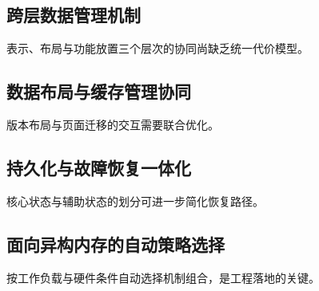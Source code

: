 \subsection{跨层数据管理机制}
表示、布局与功能放置三个层次的协同尚缺乏统一代价模型\cite{binnigEnd2016,zamanianEnd2017}。
\subsection{数据布局与缓存管理协同}
版本布局与页面迁移的交互需要联合优化\cite{xiangNomad2024,weinerTmo2022}。
\subsection{持久化与故障恢复一体化}
核心状态与辅助状态的划分可进一步简化恢复路径\cite{correiaRomulus2018,assaTl4x2023}。
\subsection{面向异构内存的自动策略选择}
按工作负载与硬件条件自动选择机制组合，是工程落地的关键\cite{leisLeanstore2018,zhongManaging2024}。
